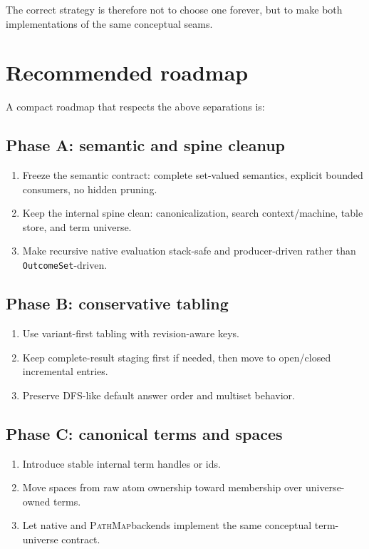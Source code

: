 \documentclass[11pt]{article}
\newcommand{\PathMap}{\textsc{PathMap}}
\begin{document}
The correct strategy is therefore not to choose one forever, but to make both implementations of the same conceptual seams.

\section{Recommended roadmap}
A compact roadmap that respects the above separations is:

\subsection*{Phase A: semantic and spine cleanup}
\begin{enumerate}
    \item Freeze the semantic contract: complete set-valued semantics, explicit bounded consumers, no hidden pruning.
    \item Keep the internal spine clean: canonicalization, search context/machine, table store, and term universe.
    \item Make recursive native evaluation stack-safe and producer-driven rather than \texttt{OutcomeSet}-driven.
\end{enumerate}

\subsection*{Phase B: conservative tabling}
\begin{enumerate}
    \item Use variant-first tabling with revision-aware keys.
    \item Keep complete-result staging first if needed, then move to open/closed incremental entries.
    \item Preserve DFS-like default answer order and multiset behavior.
\end{enumerate}

\subsection*{Phase C: canonical terms and spaces}
\begin{enumerate}
    \item Introduce stable internal term handles or ids.
    \item Move spaces from raw atom ownership toward membership over universe-owned terms.
    \item Let native and \PathMap backends implement the same conceptual term-universe contract.
\end{enumerate}
\end{document}
